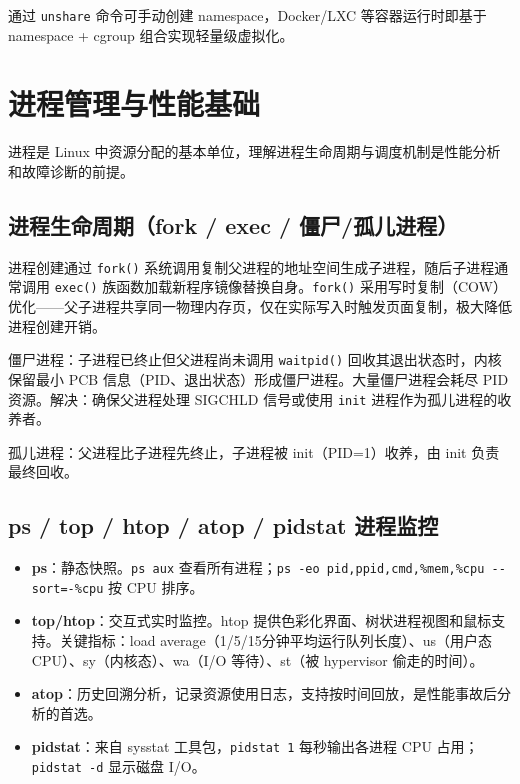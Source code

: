 \documentclass[12pt,UTF8]{ctexbook}
\begin{document}
通过 \verb|unshare| 命令可手动创建 namespace，Docker/LXC 等容器运行时即基于 namespace + cgroup 组合实现轻量级虚拟化。

  \section{进程管理与性能基础}

进程是 Linux 中资源分配的基本单位，理解进程生命周期与调度机制是性能分析和故障诊断的前提。

    \subsection{进程生命周期（fork / exec / 僵尸/孤儿进程）}

进程创建通过 \verb|fork()| 系统调用复制父进程的地址空间生成子进程，随后子进程通常调用 \verb|exec()| 族函数加载新程序镜像替换自身。\verb|fork()| 采用写时复制（COW）优化——父子进程共享同一物理内存页，仅在实际写入时触发页面复制，极大降低进程创建开销。

僵尸进程：子进程已终止但父进程尚未调用 \verb|waitpid()| 回收其退出状态时，内核保留最小 PCB 信息（PID、退出状态）形成僵尸进程。大量僵尸进程会耗尽 PID 资源。解决：确保父进程处理 SIGCHLD 信号或使用 \verb|init| 进程作为孤儿进程的收养者。

孤儿进程：父进程比子进程先终止，子进程被 init（PID=1）收养，由 init 负责最终回收。

    \subsection{ps / top / htop / atop / pidstat 进程监控}

\begin{itemize}
	\item \textbf{ps}：静态快照。\verb|ps aux| 查看所有进程；\verb|ps -eo pid,ppid,cmd,%mem,%cpu --sort=-%cpu| 按 CPU 排序。
	\item \textbf{top/htop}：交互式实时监控。htop 提供色彩化界面、树状进程视图和鼠标支持。关键指标：load average（1/5/15分钟平均运行队列长度）、us（用户态 CPU）、sy（内核态）、wa（I/O 等待）、st（被 hypervisor 偷走的时间）。
	\item \textbf{atop}：历史回溯分析，记录资源使用日志，支持按时间回放，是性能事故后分析的首选。
	\item \textbf{pidstat}：来自 sysstat 工具包，\verb|pidstat 1| 每秒输出各进程 CPU 占用；\verb|pidstat -d| 显示磁盘 I/O。
\end{itemize}
\end{document}
